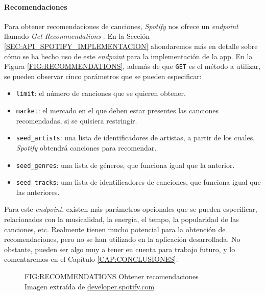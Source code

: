 \paragraph{Recomendaciones\label{subsec:recomendaciones}}

Para obtener recomendaciones de canciones, \textit{Spotify} nos ofrece un \textit{endpoint} llamado \textit{Get Recommendations} \cite{recommendations}.
En la Sección \ref{SEC:API_SPOTIFY_IMPLEMENTACION} ahondaremos más en detalle sobre cómo se ha hecho uso de este 
\textit{endpoint} para la implementación de la app. En la Figura \ref{FIG:RECOMMENDATIONS}, además de que
\texttt{GET} es el método a utilizar, se pueden observar cinco parámetros que se pueden especificar:

\begin{itemize}
  \item \texttt{limit}: el número de canciones que se quieren obtener.
  \item \texttt{market}: el mercado en el que deben estar presentes las canciones recomendadas,
  si se quisiera restringir.
  \item \texttt{seed\_artists}: una lista de identificadores de artistas, a partir de los cuales, 
  \textit{Spotify} obtendrá canciones para recomendar.
  \item \texttt{seed\_genres}: una lista de géneros, que funciona igual que la anterior.
  \item \texttt{seed\_tracks}: una lista de identificadores de canciones, que funciona igual que las anteriores.
\end{itemize}

Para este \textit{endpoint}, existen más parámetros opcionales que se pueden especificar, relacionados con 
la musicalidad, la energía, el tempo, la popularidad de las canciones, etc. Realmente tienen mucho potencial para 
la obtención de recomendaciones, pero no se han utilizado en la aplicación desarrollada. No obstante, pueden ser algo 
muy a tener en cuenta para trabajo futuro, y lo comentaremos en el Capítulo \ref{CAP:CONCLUSIONES}.

\begin{figure}[Obtener recomendaciones]{FIG:RECOMMENDATIONS}
    {Obtener recomendaciones \\
    {\scriptsize Imagen extraída de \href{https://developer.spotify.com/documentation/web-api/reference/get-recommendations}{developer.spotify.com}}}
\end{figure}

